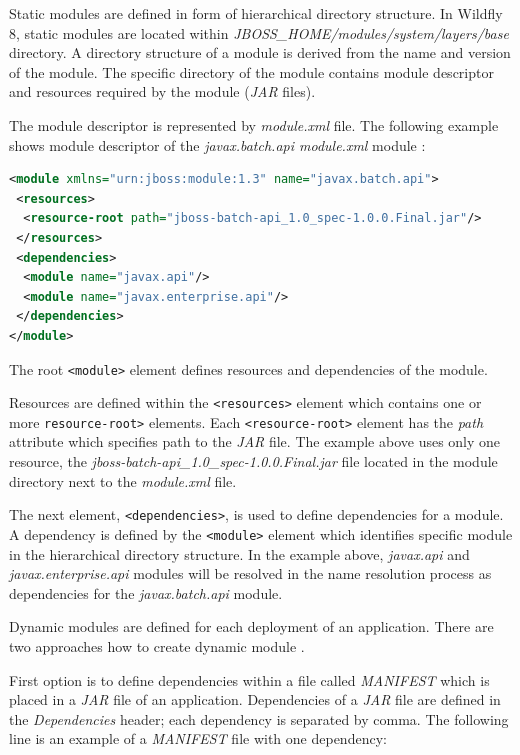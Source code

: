 \documentclass[12pt,oneside]{fithesis2}
\begin{document}
Static modules are defined in form of hierarchical directory structure. In Wildfly 8, static modules are located within \textit{JBOSS\_HOME/modules/system/layers/base} directory. A directory structure of a module is derived from the name and version of the module. The specific directory of the module contains module descriptor and resources required by the module (\textit{JAR} files).

The module descriptor is represented by \textit{module.xml} file. The following example shows module descriptor of the \textit{javax.batch.api module.xml} module \cite{wildfly_book}:
\begin{lstlisting}[caption = Example of a module descriptor, label = module_descriptor, language=XML]
<module xmlns="urn:jboss:module:1.3" name="javax.batch.api">
 <resources>
  <resource-root path="jboss-batch-api_1.0_spec-1.0.0.Final.jar"/>
 </resources>
 <dependencies>
  <module name="javax.api"/>
  <module name="javax.enterprise.api"/>
 </dependencies>    
</module>
\end{lstlisting}

The root \verb|<module>| element defines resources and dependencies of the module. 

Resources are defined within the \verb|<resources>| element which contains one or more \verb|resource-root>| elements. Each \verb|<resource-root>| element has the \textit{path} attribute which specifies path to the \textit{JAR} file. The example above uses only one resource, the \textit{jboss-batch-api\_1.0\_spec-1.0.0.Final.jar} file located in the module directory next to the \textit{module.xml} file.

The next element, \verb|<dependencies>|, is used to define dependencies for a module. A dependency is defined by the \verb|<module>| element which identifies specific module in the hierarchical directory structure. In the example above, \textit{javax.api} and \textit{javax.enterprise.api} modules will be resolved in the name resolution process as dependencies for the \textit{javax.batch.api} module.

Dynamic modules are defined for each deployment of an application. There are two approaches how to create dynamic module \cite{wildfly_book}.

First option is to define dependencies within a file called \textit{MANIFEST} which is placed in a \textit{JAR} file of an application. Dependencies of a \textit{JAR} file are defined in the \textit{Dependencies} header; each dependency is separated by comma. The following line is an example of a \textit{MANIFEST} file with one dependency:
\end{document}
